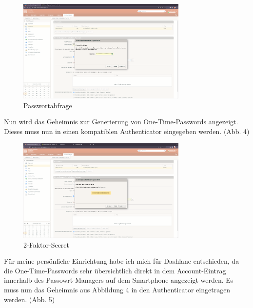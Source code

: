 \documentclass{article}
\begin{document}
\begin{figure}[H]
	\includegraphics[width=0.75\textwidth]{./images/03-passwort.png}
	\centering
	\caption{Passwortabfrage}
\end{figure}

Nun wird das Geheimnis zur Generierung von One-Time-Passwords angezeigt. Dieses
muss nun in einen kompatiblen Authenticator eingegeben werden. (Abb. 4)

\begin{figure}[H]
	\includegraphics[width=0.75\textwidth]{./images/04-secret.png}
	\centering
	\caption{2-Faktor-Secret}
\end{figure}

Für meine persönliche Einrichtung habe ich mich für Dashlane entschieden, da
die One-Time-Passwords sehr übersichtlich direkt in dem Account-Eintrag
innerhalb des Passowrt-Managers auf dem Smartphone angezeigt werden. Es muss
nun das Geheimnis aus Abbildung 4 in den Authenticator eingetragen werden.
(Abb. 5)
\end{document}
